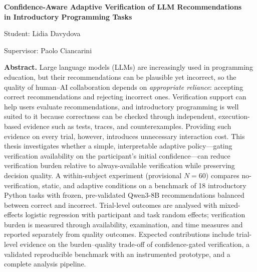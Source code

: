 \documentclass[oneside,final,14pt,a4paper]{extreport}
\begin{document}
\begingroup
\setlength{\parindent}{0pt}
\setlength{\parskip}{0pt}

\begin{center}
    {\Large\bfseries
    Confidence-Aware Adaptive Verification of LLM Recommendations\\
    in Introductory Programming Tasks\par}
    \vspace{0.5em}
    {\normalsize Student: Lidia Davydova\par}
    \vspace{0.15em}
    {\normalsize Supervisor: Paolo Ciancarini\par}
\end{center}

\vspace{0.5em}

\begin{center}
\begin{minipage}{0.85\textwidth}
\small
\noindent\textbf{Abstract.}
Large language models (LLMs) are increasingly used in programming
education, but their recommendations can be plausible yet incorrect,
so the quality of human--AI collaboration depends on
\emph{appropriate reliance}: accepting correct recommendations and
rejecting incorrect ones. Verification support can help users evaluate
recommendations, and introductory programming is well suited to it
because correctness can be checked through independent, execution-based
evidence such as tests, traces, and counterexamples. Providing such
evidence on every trial, however, introduces unnecessary interaction
cost. This thesis investigates whether a simple, interpretable adaptive
policy---gating verification availability on the participant's initial
confidence---can reduce verification burden relative to always-available
verification while preserving decision quality. A within-subject
experiment (provisional $N=60$) compares no-verification, static, and
adaptive conditions on a benchmark of 18 introductory Python tasks with
frozen, pre-validated Qwen3-8B recommendations balanced between correct
and incorrect. Trial-level outcomes are analysed with mixed-effects
logistic regression with participant and task random effects;
verification burden is measured through availability, examination,
and time measures and reported separately from quality outcomes.
Expected contributions include trial-level evidence on the
burden--quality trade-off of confidence-gated verification, a validated
reproducible benchmark with an instrumented prototype, and a complete
analysis pipeline.
\end{minipage}
\end{center}
\end{document}
